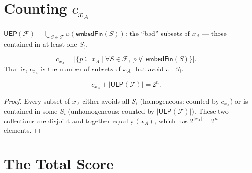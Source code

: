 \section{Counting \texorpdfstring{$c_{x_A}$}{c\_xA}}

\begin{definition}
  \label{def:union-embedded-powersets}
  \leanok
  $\mathsf{UEP}(\mathcal{F}) = \bigcup_{S \in \mathcal{F}} \wp(\mathsf{embedFin}(S))$:
  the ``bad'' subsets of $x_A$ --- those contained in at least one $S_i$.
\end{definition}

\begin{theorem}
  \label{thm:c-xA-card}
  \leanok
  \[
    c_{x_A} = |\{p \subseteq x_A \mid \forall S \in \mathcal{F},\; p
    \not\subseteq \mathsf{embedFin}(S)\}|.
  \]
  That is, $c_{x_A}$ is the number of subsets of $x_A$ that avoid all $S_i$.
\end{theorem}

\begin{theorem}
  \label{thm:c-xA-counting}
  \leanok
  \[
    c_{x_A} + |\mathsf{UEP}(\mathcal{F})| = 2^n.
  \]

  \begin{proof}
    Every subset of $x_A$ either avoids all $S_i$ (homogeneous: counted by
    $c_{x_A}$) or is contained in some $S_i$ (unhomogeneous: counted by
    $|\mathsf{UEP}(\mathcal{F})|$).  These two collections are disjoint and
    together equal $\wp(x_A)$, which has $2^{|x_A|} = 2^n$ elements.
  \end{proof}
\end{theorem}

\section{The Total Score}

